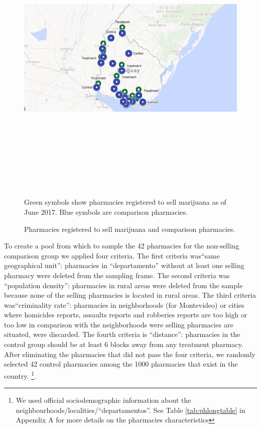 \documentclass[11pt]{article}
\begin{document}
\begin{figure}[htpb!]
    \centering
    \label{fig:ctrltrtpharms_1}
    \caption{Pharmacies registered to sell marijuana and comparison pharmacies.}
    \includegraphics[width=6in,height=5.6851in]{./media/country.png}
\footnotesize{Green symbols show pharmacies registered to sell marijuana as of June 2017. Blue symbols are comparison pharmacies.}
\end{figure}

To create a pool from which to sample the 42 pharmacies for the non-selling comparison group we applied four criteria. The first criteria was``same  geographical unit'':  pharmacies in ``departamento'' without at least one selling pharmacy were deleted from the sampling frame. The second criteria was ``population density'':  pharmacies in rural areas were deleted from the sample because none of the selling pharmacies is located in rural areas. The third criteria was``criminality rate'': pharmacies in neighborhoods (for Montevideo) or   cities where homicides reports, assaults reports and robberies reports are too high or too low  in comparison with the neighborhoods were selling pharmacies are  situated, were discarded. The fourth criteria is ``distance'': pharmacies in the control group should be at least 6 blocks away from any treatment pharmacy. After eliminating the pharmacies that did not pass the four criteria, we randomly selected 42 control pharmacies among the 1000 pharmacies that exist in the country. \footnote{We used official sociodemographic information about the neighbourhoods/localities/``departamentos''. See Table \ref{tab:phlongtable} in Appendix A for more details on the pharmacies characteristics}.
\end{document}
